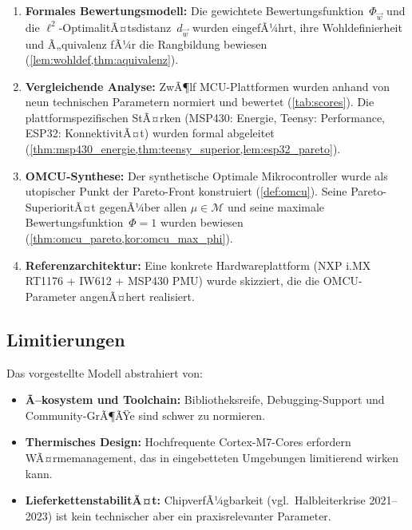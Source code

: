 ﻿\documentclass[12pt, a4paper]{article}
\theoremstyle{plain}
\theoremstyle{definition}
\theoremstyle{remark}
\begin{document}
\begin{enumerate}[label=(\roman*)]
  \item \textbf{Formales Bewertungsmodell:}
        Die gewichtete Bewertungsfunktion~$\Phi_{\vec{w}}$ und die
        $\ell^2$-OptimalitÃ¤tsdistanz~$d_{\vec{w}}$ wurden eingefÃ¼hrt,
        ihre Wohldefinierheit und Ã„quivalenz fÃ¼r die Rangbildung bewiesen
        (\cref{lem:wohldef,thm:aquivalenz}).

  \item \textbf{Vergleichende Analyse:}
        ZwÃ¶lf MCU-Plattformen wurden anhand von neun technischen
        Parametern normiert und bewertet (\cref{tab:scores}).
        Die plattformspezifischen StÃ¤rken (MSP430: Energie,
        Teensy: Performance, ESP32: KonnektivitÃ¤t) wurden formal
        abgeleitet (\cref{thm:msp430_energie,thm:teensy_superior,lem:esp32_pareto}).

  \item \textbf{OMCU-Synthese:}
        Der synthetische Optimale Mikrocontroller wurde als utopischer
        Punkt der Pareto-Front konstruiert (\cref{def:omcu}).
        Seine Pareto-SuperioritÃ¤t gegenÃ¼ber allen $\mu \in \mathcal{M}$
        und seine maximale Bewertungsfunktion~$\Phi = 1$ wurden bewiesen
        (\cref{thm:omcu_pareto,kor:omcu_max_phi}).

  \item \textbf{Referenzarchitektur:}
        Eine konkrete Hardwareplattform (NXP i.MX\,RT1176 + IW612 + MSP430 PMU)
        wurde skizziert, die die OMCU-Parameter angenÃ¤hert realisiert.
\end{enumerate}

\subsection{Limitierungen}

Das vorgestellte Modell abstrahiert von:
\begin{itemize}
  \item \textbf{Ã–kosystem und Toolchain:}
        Bibliotheksreife, Debugging-Support und
        Community-GrÃ¶ÃŸe sind schwer zu normieren.
  \item \textbf{Thermisches Design:}
        Hochfrequente Cortex-M7-Cores erfordern WÃ¤rmemanagement,
        das in eingebetteten Umgebungen limitierend wirken kann.
  \item \textbf{LieferkettenstabilitÃ¤t:}
        ChipverfÃ¼gbarkeit (vgl.\ Halbleiterkrise 2021--2023) ist kein
        technischer aber ein praxisrelevanter Parameter.
\end{itemize}
\end{document}
